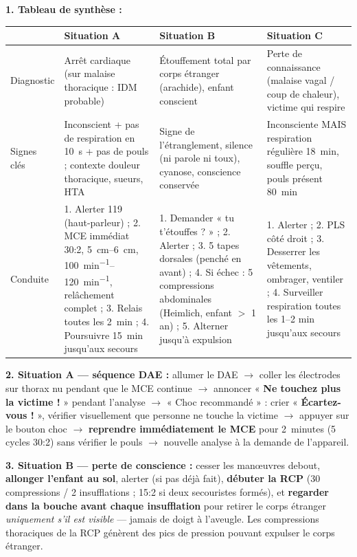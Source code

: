\documentclass[11pt]{article}
\begin{document}
\begin{corrige}
\textbf{1. Tableau de synthèse :}
\begin{center}
\begin{tabularx}{\linewidth}{|l|X|X|X|}
\hline
\rowcolor{popblueL}
& \textbf{Situation A} & \textbf{Situation B} & \textbf{Situation C} \\
\hline
Diagnostic & Arrêt cardiaque (sur malaise thoracique : IDM probable) & Étouffement total par corps étranger (arachide), enfant conscient & Perte de connaissance (malaise vagal / coup de chaleur), victime qui respire \\
\hline
Signes clés & Inconscient + pas de respiration en \SI{10}{s} + pas de pouls ; contexte douleur thoracique, sueurs, HTA & Signe de l'étranglement, silence (ni parole ni toux), cyanose, conscience conservée & Inconsciente MAIS respiration régulière \SI{18}{min}, souffle perçu, pouls présent \SI{80}{min} \\
\hline
Conduite & 1. Alerter 119 (haut-parleur) ; 2. MCE immédiat 30:2, \SIrange{5}{6}{cm}, \SIrange{100}{120}{min^{-1}}, relâchement complet ; 3. Relais toutes les \SI{2}{min} ; 4. Poursuivre \SI{15}{min} jusqu'aux secours & 1. Demander « tu t'étouffes ? » ; 2. Alerter ; 3. 5 tapes dorsales (penché en avant) ; 4. Si échec : 5 compressions abdominales (Heimlich, enfant $>$ 1 an) ; 5. Alterner jusqu'à expulsion & 1. Alerter ; 2. PLS côté droit ; 3. Desserrer les vêtements, ombrager, ventiler ; 4. Surveiller respiration toutes les 1--2 min jusqu'aux secours \\
\hline
\end{tabularx}
\end{center}
\textbf{2. Situation A — séquence DAE :} allumer le DAE $\rightarrow$ coller les électrodes sur thorax nu pendant que le MCE continue $\rightarrow$ annoncer « \textbf{Ne touchez plus la victime !} » pendant l'analyse $\rightarrow$ « Choc recommandé » : crier « \textbf{Écartez-vous !} », vérifier visuellement que personne ne touche la victime $\rightarrow$ appuyer sur le bouton choc $\rightarrow$ \textbf{reprendre immédiatement le MCE} pour \SI{2}{minutes} (5 cycles 30:2) sans vérifier le pouls $\rightarrow$ nouvelle analyse à la demande de l'appareil.

\textbf{3. Situation B — perte de conscience :} cesser les manœuvres debout, \textbf{allonger l'enfant au sol}, alerter (si pas déjà fait), \textbf{débuter la RCP} (30 compressions / 2 insufflations ; 15:2 si deux secouristes formés), et \textbf{regarder dans la bouche avant chaque insufflation} pour retirer le corps étranger \emph{uniquement s'il est visible} — jamais de doigt à l'aveugle. Les compressions thoraciques de la RCP génèrent des pics de pression pouvant expulser le corps étranger.


\end{corrige}
\end{document}
